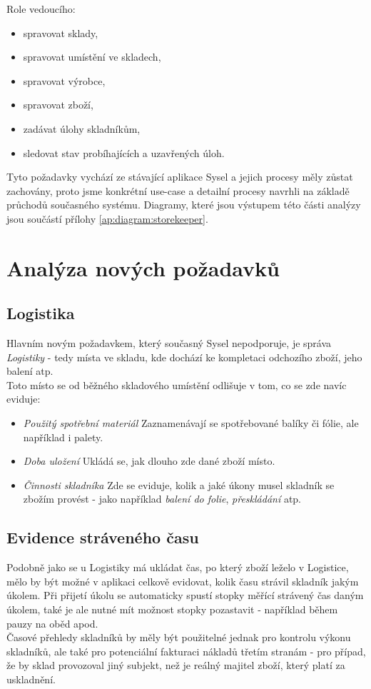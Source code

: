 Role vedoucího:
\begin{itemize}
	\item spravovat sklady,
	\item spravovat umístění ve skladech,
	\item spravovat výrobce,
	\item spravovat zboží,
	\item zadávat úlohy skladníkům,
	\item sledovat stav probíhajících a uzavřených úloh.
\end{itemize}

Tyto požadavky vychází ze stávající aplikace Sysel a jejich procesy měly zůstat zachovány, proto jsme konkrétní use-case a detailní procesy navrhli na základě průchodů současného systému. Diagramy, které jsou výstupem této části analýzy jsou součástí přílohy \ref{ap:diagram:storekeeper}.

\section{Analýza nových požadavků}

\subsection{Logistika}

Hlavním novým požadavkem, který současný Sysel nepodporuje, je správa \emph{Logistiky} - tedy místa ve skladu, kde dochází ke kompletaci odchozího zboží, jeho balení atp.\\
Toto místo se od běžného skladového umístění odlišuje v tom, co se zde navíc eviduje:
\begin{itemize}
	\item \emph{Použitý spotřební materiál} Zaznamenávají se spotřebované balíky či fólie, ale například i palety.
	\item \emph{Doba uložení} Ukládá se, jak dlouho zde dané zboží  místo.
	\item \emph{Činnosti skladníka} Zde se eviduje, kolik a jaké úkony musel skladník se zbožím provést - jako například \emph{balení do folie}, \emph{přeskládání} atp.
\end{itemize}

\subsection{Evidence stráveného času}

Podobně jako se u Logistiky má ukládat čas, po který zboží leželo v Logistice, mělo by být možné v aplikaci celkově evidovat, kolik času strávil skladník jakým úkolem. Při přijetí úkolu se automaticky spustí stopky měřící strávený čas daným úkolem, také je ale nutné mít možnost stopky pozastavit - například během pauzy na oběd apod.\\
Časové přehledy skladníků by měly být použitelné jednak pro kontrolu výkonu skladníků, ale také pro potenciální fakturaci nákladů třetím stranám - pro případ, že by sklad provozoval jiný subjekt, než je reálný majitel zboží, který platí za uskladnění.

